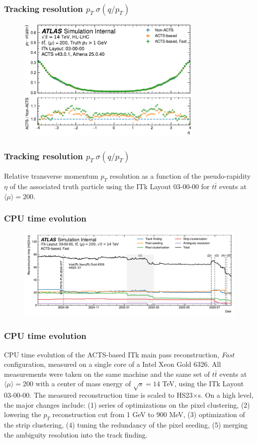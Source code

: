 \documentclass[aspectratio=169]{beamer}
\begin{document}
\begin{frame}
\frametitle{Tracking resolution $p_T \ \sigma(q/p_T)$}
\begin{figure}[h]
    \centering
    \includegraphics[width=0.8\textwidth]{plots/tracking_resolution_ptqopt.pdf}
\end{figure}
\end{frame}

\begin{frame}
\frametitle{Tracking resolution $p_T \ \sigma(q/p_T)$}
Relative transverse momentum $p_T$ resolution as a function of the pseudo-rapidity $\eta$ of the associated truth particle using the ITk Layout 03-00-00 for $t\bar{t}$ events at $\langle \mu \rangle = 200$.
\end{frame}

\begin{frame}
\frametitle{CPU time evolution}
\begin{figure}[h]
    \centering
    \includegraphics[width=1.0\textwidth]{plots/spot.pdf}
\end{figure}
\end{frame}

\begin{frame}
\frametitle{CPU time evolution}
CPU time evolution of the ACTS-based ITk main pass reconstruction, \textit{Fast} configuration, measured on a single core of a Intel Xeon Gold 6326. All measurements were taken on the same machine and the same set of $t\bar{t}$ events at $\langle \mu \rangle = 200$ with a center of mass energy of $\sqrt{s}=14$ TeV, using the ITk Layout 03-00-00. The measured reconstruction time is scaled to HS23$\times$s. On a high level, the major changes include: (1) series of optimizations on the pixel clustering, (2) lowering the $p_T$ reconstruction cut from 1 GeV to 900 MeV, (3) optimization of the strip clustering, (4) tuning the redundancy of the pixel seeding, (5) merging the ambiguity resolution into the track finding.
\end{frame}
\end{document}
